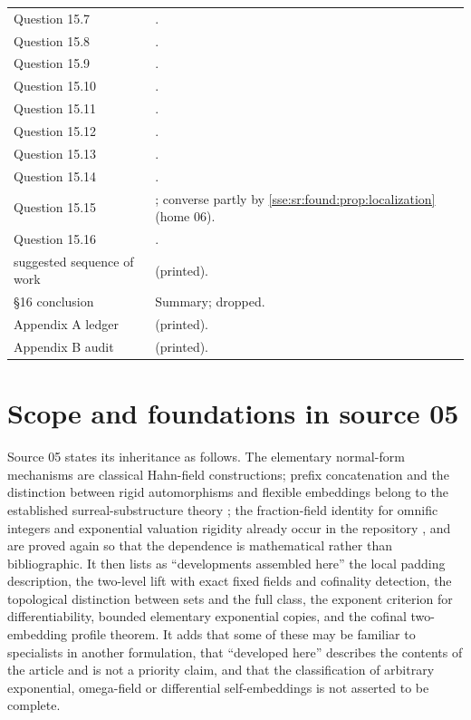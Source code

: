 \documentclass[11pt,a4paper]{article}
\numberwithin{equation}{section}
\theoremstyle{plain}
\theoremstyle{definition}
\theoremstyle{remark}
\begin{document}
\begin{longtable}{P{34mm}P{116mm}}
Question 15.7 & . \\
Question 15.8 & . \\
Question 15.9 & . \\
Question 15.10 & . \\
Question 15.11 & . \\
Question 15.12 & . \\
Question 15.13 & . \\
Question 15.14 & . \\
Question 15.15 & ; converse partly by \cref{sse:sr:found:prop:localization} (home 06). \\
Question 15.16 & . \\
suggested sequence of work &  (printed). \\
\S16 conclusion & Summary; dropped. \\
Appendix A ledger &  (printed). \\
Appendix B audit &  (printed). \\
\bottomrule
\end{longtable}
\endgroup

\section{Scope and foundations in source 05}\label{sse:co:sec:scope}

Source 05 states its inheritance as follows. The elementary normal-form
mechanisms are classical Hahn-field constructions; prefix concatenation and
the distinction between rigid automorphisms and flexible embeddings belong to
the established surreal-substructure theory \cite{BVH}; the fraction-field
identity for omnific integers and exponential valuation rigidity already
occur in the repository \cite{RepoExp,co-RepoOz}, and are proved again so
that the dependence is mathematical rather than bibliographic. It then lists
as ``developments assembled here'' the local padding description, the
two-level lift with exact fixed fields and cofinality detection, the
topological distinction between sets and the full class, the exponent
criterion for differentiability, bounded elementary exponential copies, and
the cofinal two-embedding profile theorem. It adds that some of these may be
familiar to specialists in another formulation, that ``developed here''
describes the contents of the article and is not a priority claim, and that
the classification of arbitrary exponential, omega-field or differential
self-embeddings is not asserted to be complete.
\end{document}
